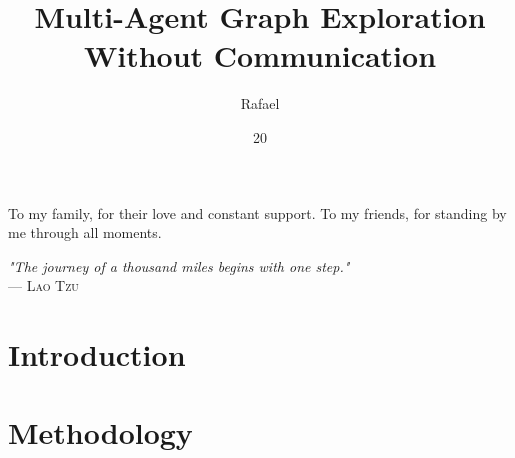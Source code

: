 \documentclass[tg, eng]{ita}    %
\author{Rafael}{Studart Mattos Di Piero}
\title{Multi-Agent Graph Exploration Without Communication}
\date{20}{Jun}{2024}
\begin{document}
\maketitle

\begin{itadedication}
  To my family, for their love and constant support. 
  To my friends, for standing by me through all moments. 
\end{itadedication}

\begin{itathanks}

\end{itathanks}


\thispagestyle{empty}
\ifhyperref{}\fi
\begin{flushright}
\begin{spacing}{1}
\mbox{}\vfill
{\sffamily\itshape
"The journey of a thousand miles begins with one step."\\
}
--- \textsc{
Lao Tzu
}
\end{spacing}
\end{flushright}

\begin{abstract}
\noindent

\end{abstract}

\begin{englishabstract}
\noindent

\end{englishabstract}

\listoffigures %


\listofalgorithms %

\listofabbreviations

\listofsymbols

\tableofcontents

\mainmatter

\chapter{Introduction}


\chapter{Methodology}

\end{document}

